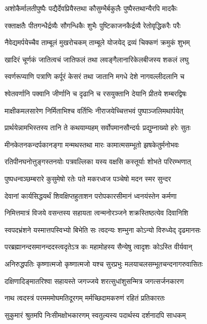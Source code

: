 \twolineshloka
{अशोकैर्मालतीपुष्पैः पद्यैर्देवप्रियैस्तथा}
{कौसुम्भैर्बकुलैः पुष्पैस्तथान्यैरपि मादकैः} %

\twolineshloka
{रक्ताक्षतैः पीतगन्धैर्द्रव्यैः सौगन्धिकैः शुभैः}
{पुष्टिकाजनकैर्द्रव्यै रेतोवृद्धिकरैः परैः} %

\twolineshloka
{नैवेद्यमर्पयेच्चैव ताम्बूलं मुखरोचकम्}
{ताम्बूले योजयेद् द्रव्यं चिक्कणं क्रमुकं शुभम्} %

\twolineshloka
{खादिरं चूर्णकं जातित्वचं जातिफलं तथा}
{लवङ्गैलानारिकेलबीजस्य शकलं लघु} %

\twolineshloka
{स्वर्णरूप्याणि पत्राणि कर्पूरं केसरं तथा}
{जातानि मगधे देशे नागवल्लीदलानि च} %

\twolineshloka
{श्वेतवर्णानि पक्वानि जीर्णानि च दृढानि च}
{रसयुक्तानि देयानि प्रीतये शम्बरद्विषः} %

\twolineshloka
{माक्षीकमलसारेण निर्मिताभिश्च वर्तिभिः}
{नीराजयेच्चित्तभवं पुष्पाञ्जलिमथार्पयेत्} %

\twolineshloka
{प्रार्थयेन्नामभिस्तस्य तानि ते कथयाम्यहम्}
{सर्वोपमानसौन्दर्यः प्रद्युम्नाख्यो हरेः सुतः} %

\twolineshloka
{मीनकेतनकन्दर्पकानङ्गा मन्मथस्तथा}
{मारः कामात्मसम्भूतो झषकेतुर्मनोभवः} %

\twolineshloka
{रतिपीनघनोत्तुङ्गस्तनयोः पत्रवल्लिका}
{यस्य वक्षसि कस्तूर्याः शोभते परिरम्भणात्} %

\twolineshloka
{पुष्पधन्वञ्छम्बरारे कुसुमेषो रतेः पते}
{मकरध्वज पञ्चेषो मदन स्मर सुन्दर} %

\twolineshloka
{देवानां कार्यसिद्धयर्थं शिवक्षिप्तहुताशन}
{परोपकारसीमानं ध्वनयंस्तेन कर्मणा} %

\twolineshloka
{निमित्तमात्रं विजये वसन्तस्य सहायता}
{त्वन्मनोरञ्जने शक्रस्तिष्ठत्येव दिवानिशि} %

\twolineshloka
{स्वपदभ्रंशने यस्मात्तपस्विभ्यो बिभेति सः}
{त्वदन्यः शम्भुना कोऽन्यो विरुध्येद् दृढमानसः} %

\twolineshloka
{परब्रह्मानन्दसमानन्ददस्त्वदृतेऽत्र कः}
{महामोहस्य सैन्येषु त्वादृशः कोऽस्ति वीर्यवान्} %

\twolineshloka
{अनिरुद्धपतिः कृष्णात्मजो कृष्णात्मजो यश्च सुरप्रभुः}
{मलयाचलसम्भूतचन्दनागरुवासितः} %

\twolineshloka
{दक्षिणादिङ्मातरिश्वा सहायस्ते जगज्जये}
{शरत्सुधांशुसन्मित्र जगत्सर्जनकारण} %

\twolineshloka
{नाथ त्वदस्त्रं परमममोघमतिदूरगम्}
{मर्मच्छिदामकरुणं रहितं प्रतिकारतः} %

\twolineshloka
{सुकुमारं श्रुतमपि निःसीमक्षोभकारणम्}
{स्वतुल्यस्य पदार्थस्य दर्शनादपि साधकम्} %

